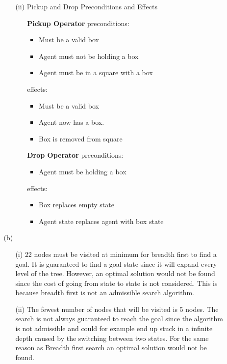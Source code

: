 \begin{enumerate}
\begin{enumerate}
\begin{enumerate}
					\item[(ii)] Pickup and Drop Preconditions and Effects
					\begin{enumerate}
						\item[\bf Pickup Operator] 
							preconditions:
							\begin{itemize}
								\item{Must be a valid box}
								\item{Agent must not be holding a box}
								\item{Agent must be in a square with a box}
							\end{itemize}
							effects:
							\begin{itemize}
								\item{Must be a valid box}
								\item{Agent now has a box.}
								\item{Box is removed from square}
							\end{itemize}
						\item[\bf Drop Operator]
							preconditions:
							\begin{itemize}
								\item{Agent must be holding a box}
							\end{itemize}
							effects:
							\begin{itemize}
								\item{Box replaces empty state}
								\item{Agent state replaces agent with box state}
							\end{itemize}
					\end{enumerate}
					
				\end{enumerate}
			\item[(b)]
				\begin{enumerate}
					\item[(i)] 22 nodes must be visited at minimum for breadth first to find a goal.  It is guaranteed to find a goal state since it will expand every level of the tree.  However, an optimal solution would not be found since the cost of going from state to state is not considered.  This is because breadth first is not an admissible search algorithm.
					
					\item[(ii)] The fewest number of nodes that will be visited is 5 nodes. The search is not always guaranteed to reach the goal since the algorithm is not admissible and could for example end up stuck in a infinite depth caused by the switching between two states.  For the same reason as Breadth first search an optimal solution would not be found.
					

\end{enumerate}
\end{enumerate}
\end{enumerate}
